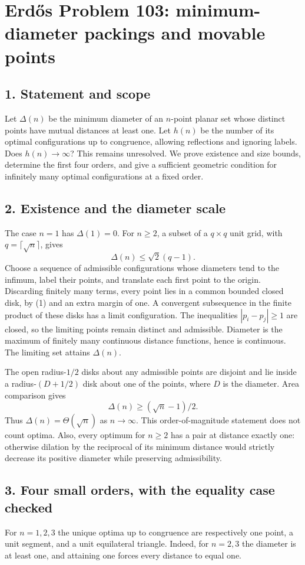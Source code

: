 \section*{Erd\H{o}s Problem 103: minimum-diameter packings and movable points}

\subsection*{1. Statement and scope}
Let $\Delta(n)$ be the minimum diameter of an $n$-point planar set whose distinct points have mutual distances at least one. Let $h(n)$ be the number of its optimal configurations up to congruence, allowing reflections and ignoring labels. Does $h(n)\to\infty$? This remains unresolved. We prove existence and size bounds, determine the first four orders, and give a sufficient geometric condition for infinitely many optimal configurations at a fixed order.

\subsection*{2. Existence and the diameter scale}
The case $n=1$ has $\Delta(1)=0$. For $n\ge2$, a subset of a $q\times q$ unit grid, with $q=\lceil\sqrt n\rceil$, gives
\[
 \Delta(n)\le\sqrt2(q-1).\tag{1}
\]
Choose a sequence of admissible configurations whose diameters tend to the infimum, label their points, and translate each first point to the origin. Discarding finitely many terms, every point lies in a common bounded closed disk, by (1) and an extra margin of one. A convergent subsequence in the finite product of these disks has a limit configuration. The inequalities $|p_i-p_j|\ge1$ are closed, so the limiting points remain distinct and admissible. Diameter is the maximum of finitely many continuous distance functions, hence is continuous. The limiting set attains $\Delta(n)$.

The open radius-$1/2$ disks about any admissible points are disjoint and lie inside a radius-$(D+1/2)$ disk about one of the points, where $D$ is the diameter. Area comparison gives
\[
 \Delta(n)\ge(\sqrt n-1)/2.\tag{2}
\]
Thus $\Delta(n)=\Theta(\sqrt n)$ as $n\to\infty$. This order-of-magnitude statement does not count optima. Also, every optimum for $n\ge2$ has a pair at distance exactly one: otherwise dilation by the reciprocal of its minimum distance would strictly decrease its positive diameter while preserving admissibility.

\subsection*{3. Four small orders, with the equality case checked}
For $n=1,2,3$ the unique optima up to congruence are respectively one point, a unit segment, and a unit equilateral triangle. Indeed, for $n=2,3$ the diameter is at least one, and attaining one forces every distance to equal one.

